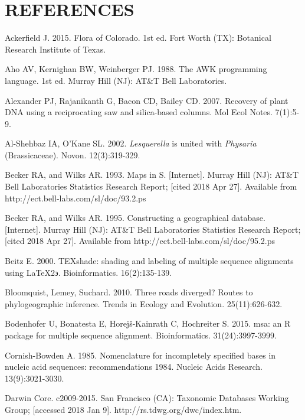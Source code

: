 \chapter*{REFERENCES}
\vspace*{-12pt}

\setlength{\parindent}{-4em}
\setlength{\leftskip}{4em}
\setlength{\parskip}{12pt}
\singlespacing

\hspace*{-4em}Ackerfield J. 2015. Flora of Colorado. 1st ed. Fort Worth (TX): Botanical Research Institute of Texas.

Aho AV, Kernighan BW, Weinberger PJ. 1988. The AWK programming language. 1st ed. Murray Hill (NJ): AT\&T Bell Laboratories.

Alexander PJ, Rajanikanth G, Bacon CD, Bailey CD. 2007. Recovery of plant DNA using a reciprocating saw and silica-based columns. Mol Ecol Notes. 7(1):5-9.

Al-Shehbaz IA, O’Kane SL. 2002. \textit{Lesquerella} is united with \textit{Physaria} (Brassicaceae). Novon. 12(3):319-329.

Becker RA, and Wilks AR. 1993. Maps in S. [Internet]. Murray Hill (NJ): AT\&T Bell Laboratories Statistics Research Report; [cited 2018 Apr 27]. Available from http://ect.bell-labs.com/sl/doc/93.2.ps

Becker RA, and Wilks AR. 1995. Constructing a geographical database. [Internet]. Murray Hill (NJ): AT\&T Bell Laboratories Statistics Research Report; [cited 2018 Apr 27]. Available from http://ect.bell-labs.com/sl/doc/95.2.ps

Beitz E. 2000. TEXshade: shading and labeling of multiple sequence alignments using \LaTeX 2$\backepsilon$. Bioinformatics. 16(2):135-139.

Bloomquist, Lemey, Suchard. 2010. Three roads diverged? Routes to phylogeographic inference. Trends in Ecology and Evolution. 25(11):626-632.

Bodenhofer U, Bonatesta E, Horej\v{s}-Kainrath C, Hochreiter S. 2015. msa: an R package for multiple sequence alignment. Bioinformatics. 31(24):3997-3999. 

Cornish-Bowden A. 1985. Nomenclature for incompletely specified bases in nucleic acid sequences: recommendations 1984.  Nucleic Acids Research. 13(9):3021-3030.

Darwin Core. c2009-2015. San Francisco (CA): Taxonomic Databases Working Group; [accessed 2018 Jan 9]. http://rs.tdwg.org/dwc/index.htm.

